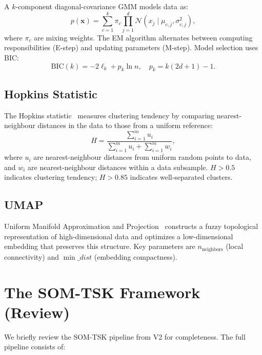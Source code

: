 \documentclass[journal]{IEEEtran}
\begin{document}
A $k$-component diagonal-covariance GMM models data as:
\begin{equation}
  p(\mathbf{x}) = \sum_{c=1}^k \pi_c \prod_{j=1}^d \mathcal{N}(x_j \mid \mu_{c,j}, \sigma^2_{c,j}),
\end{equation}
where $\pi_c$ are mixing weights. The EM algorithm alternates between computing responsibilities (E-step) and updating parameters (M-step). Model selection uses BIC:
\begin{equation}
  \mathrm{BIC}(k) = -2\ell_k + p_k \ln n, \quad p_k = k(2d+1) - 1.
\end{equation}

\subsection{Hopkins Statistic}

The Hopkins statistic~\cite{hopkins1954new} measures clustering tendency by comparing nearest-neighbour distances in the data to those from a uniform reference:
\begin{equation}
  H = \frac{\sum_{i=1}^m u_i}{\sum_{i=1}^m u_i + \sum_{i=1}^m w_i},
\end{equation}
where $u_i$ are nearest-neighbour distances from uniform random points to data, and $w_i$ are nearest-neighbour distances within a data subsample. $H > 0.5$ indicates clustering tendency; $H > 0.85$ indicates well-separated clusters.

\subsection{UMAP}

Uniform Manifold Approximation and Projection~\cite{mcinnes2018umap} constructs a fuzzy topological representation of high-dimensional data and optimizes a low-dimensional embedding that preserves this structure. Key parameters are $n_{\text{neighbors}}$ (local connectivity) and $\min\_dist$ (embedding compactness).

\section{The SOM-TSK Framework (Review)}
\label{sec:som_tsk}

We briefly review the SOM-TSK pipeline from V2 for completeness. The full pipeline consists of:
\end{document}
